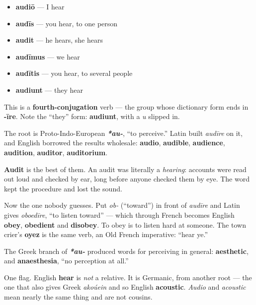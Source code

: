 \begin{itemize}
\raggedright
  \item \textbf{audiō} — I hear
  \item \textbf{audīs} — you hear, to one person
  \item \textbf{audit} — he hears, she hears
  \item \textbf{audīmus} — we hear
  \item \textbf{audītis} — you hear, to several people
  \item \textbf{audiunt} — they hear
\end{itemize}

This is a \textbf{fourth-conjugation} verb — the group whose dictionary form ends in \textbf{-īre}. Note the \textquotedblleft{}they\textquotedblright{} form: \textbf{audiunt}, with a \emph{u} slipped in.

\begin{cousinweb}
The root is Proto-Indo-European \emph{\textbf{*au-}}, \textquotedblleft{}to perceive.\textquotedblright{} Latin built \emph{audīre} on it, and English borrowed the results wholesale: \textbf{audio}, \textbf{audible}, \textbf{audience}, \textbf{audition}, \textbf{auditor}, \textbf{auditorium}.

\textbf{Audit} is the best of them. An audit was literally a \emph{hearing}: accounts were read out loud and checked by ear, long before anyone checked them by eye. The word kept the procedure and lost the sound.

Now the one nobody guesses. Put \emph{ob-} (\textquotedblleft{}toward\textquotedblright{}) in front of \emph{audīre} and Latin gives \emph{oboedīre}, \textquotedblleft{}to listen toward\textquotedblright{} — which through French becomes English \textbf{obey}, \textbf{obedient} and \textbf{disobey}. To obey is to listen hard at someone. The town crier's \textbf{oyez} is the same verb, an Old French imperative: \textquotedblleft{}hear ye.\textquotedblright{}

The Greek branch of \emph{\textbf{*au-}} produced words for perceiving in general: \textbf{aesthetic}, and \textbf{anaesthesia}, \textquotedblleft{}no perception at all.\textquotedblright{}

One flag. English \textbf{hear} is \emph{not} a relative. It is Germanic, from another root — the one that also gives Greek \emph{akoúein} and so English \textbf{acoustic}. \emph{Audio} and \emph{acoustic} mean nearly the same thing and are not cousins.
\end{cousinweb}

